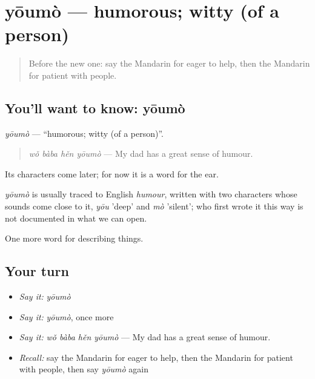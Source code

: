 \section[yōumò]{yōumò — humorous; witty (of a person)}

\label{lesson:ZH-C258-youmo}



\begin{quote}
Before the new one: say the Mandarin for eager to help, then the Mandarin for patient with people.
\end{quote}

\subsection*{You'll want to know: yōumò}
\emph{yōumò} — \textquotedblleft{}humorous; witty (of a person)\textquotedblright{}.

\begin{quote}
\emph{wǒ bàba hěn yōumò} — My dad has a great sense of humour.
\end{quote}

Its characters come later; for now it is a word for the ear.

\begin{cousinweb}
\emph{yōumò} is usually traced to English \emph{humour}, written with two characters whose sounds come close to it, \emph{yōu} 'deep' and \emph{mò} 'silent'; who first wrote it this way is not documented in what we can open.
\end{cousinweb}

\begin{grammarlens}[title={What you've built}]
One more word for describing things.
\end{grammarlens}

\subsection*{Your turn}
\begin{itemize}
\raggedright
  \item \emph{Say it:} \emph{yōumò}
  \item \emph{Say it:} \emph{yōumò}, once more
  \item \emph{Say it:} \emph{wǒ bàba hěn yōumò} — My dad has a great sense of humour.
  \item \emph{Recall:} say the Mandarin for eager to help, then the Mandarin for patient with people, then say \emph{yōumò} again
\end{itemize}

